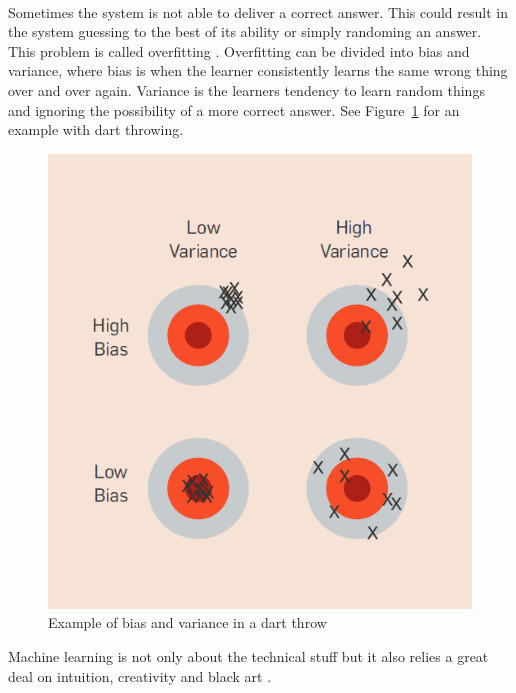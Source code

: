 \\[0.5cm]
Sometimes the system is not able to deliver a correct answer. This could result in the system guessing to the best of its ability or simply randoming an answer. This problem is called overfitting \cite{18}. Overfitting can be divided into bias and variance, where bias is when the learner consistently learns the same wrong thing over and over again. Variance is the learners tendency to learn random things and ignoring the possibility of a more correct answer. See Figure~\ref{fig:biasandvariance} for an example with dart throwing.
\begin{figure}[H]
\centering
\includegraphics[width=0.5\linewidth,natwidth=898,natheight=587]{billeder/biasVSvariance.png}
\caption{Example of bias and variance in a dart throw \cite{18}}
\label{fig:biasandvariance}
\end{figure}

Machine learning is not only about the technical stuff but it also relies a great deal on intuition, creativity and  black art \cite{18}. 
